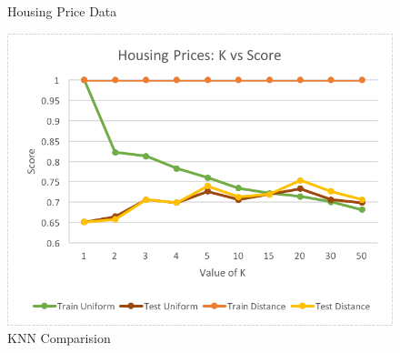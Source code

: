 \documentclass[h]{article}
\begin{document}
\begin{figure}[H]
\begin{tabular}{ | c | c  | c | c | c | c | c |}
\hline
\end{tabular}
\caption*{Housing Price Data}
\endminipage\hfill
      \includegraphics[width=1\textwidth,keepaspectratio]{2_knn_compare.png} 
      \caption*{KNN Comparision} 
   \endminipage\hfill
\end{figure}
 
\end{document}

